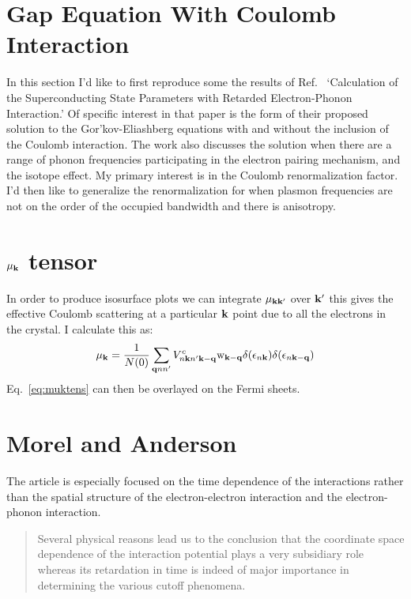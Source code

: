 \documentclass{article}
\def\k{{\bf k}}
\def\q{{\bf q}}
\begin{document}
\section{Gap Equation With Coulomb Interaction}
In this section I'd like to first reproduce some the results of Ref.~\cite{morel62} `Calculation
of the Superconducting State Parameters with Retarded Electron-Phonon Interaction.' Of specific interest
in that paper is the form of their proposed solution to the Gor'kov-Eliashberg equations with and without
the inclusion of the Coulomb interaction. The work also discusses the solution when there are a range of phonon
frequencies participating in the electron pairing mechanism, and the isotope effect. My primary interest is
in the Coulomb renormalization factor. I'd then like to generalize the renormalization for when plasmon frequencies
are not on the order of the occupied bandwidth and there is anisotropy.
%
\section{$\mu_{\k}$ tensor}
%
In order to produce isosurface plots we can integrate $\mu_{\k\k'}$ over $\k'$ this
gives the effective Coulomb scattering at a particular $\k$ point due to 
all the electrons in the crystal. I calculate this as:
%
\begin{equation}
\label{eq:muktens}
\mu_{\k} = \frac{1}{N(0)}\sum_{\q nn'}V^{c}_{n\k n'\k-\q}{\rm w}_{\k-\q}\delta(\epsilon_{n\k})\delta(\epsilon_{n\k-\q})
\end{equation}
%
Eq.~\ref{eq:muktens} can then be overlayed on the Fermi sheets. 


\section{Morel and Anderson}
%
The article is especially focused on the time dependence of the interactions rather than the
spatial structure of the electron-electron interaction and the electron-phonon interaction.
%
\begin{quote}
Several physical reasons lead us to the conclusion that the coordinate space dependence
of the interaction potential plays a very subsidiary role whereas its retardation 
in time is indeed of major importance in determining the various cutoff phenomena.
\end{quote}
%
\end{document}
